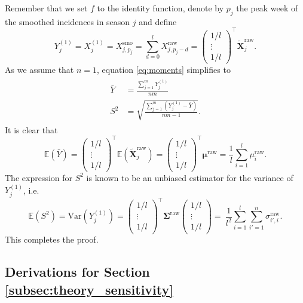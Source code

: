 \documentclass{article}
\begin{document}
Remember that we set $f$ to the identity function, denote by $p_j$ the peak week of the smoothed incidences in season $j$ and define
$$
Y_j^{(1)} = X_j^{(1)} = X^\text{smo}_{j, p_j} = \sum_{d = 0}^l X^\text{raw}_{j, p_j - d} = \begin{pmatrix} 1/l \\ \vdots \\ 1/l \end{pmatrix}^\top \tilde{\mathbf{X}}^{\text{raw}}_j.
$$
As we assume that $n = 1$, equation \eqref{eq:moments} simplifies to
\begin{align}
\begin{split}
\bar{Y} & = \frac{\sum_{j = 1}^m Y_j^{(1)}}{nm}\\
S^2 & = \sqrt{ \frac{\sum_{j = 1}^m (Y_j^{(1)}  - \bar{Y})}{nm - 1}}.
\end{split}
\end{align}
It is clear that
$$
\mathbb{E}(\bar{Y}) = \begin{pmatrix} 1/l \\ \vdots \\ 1/l \end{pmatrix}^\top \mathbb{E}(\tilde{\mathbf{X}}^{\text{raw}}_j) = \begin{pmatrix} 1/l \\ \vdots \\ 1/l \end{pmatrix}^\top \boldsymbol{\mu}^\text{raw} = \frac{1}{l}\sum_{i = 1}^l \mu^\text{raw}_i.
$$
The expression for $S^2$ is known to be an unbiased estimator for the variance of $Y_j^{(1)}$, i.e.
$$
\mathbb{E}(S^2) = \text{Var}(Y_j^{(1)}) = \begin{pmatrix} 1/l \\ \vdots \\ 1/l \end{pmatrix}^\top \mathbf{\Sigma}^\text{raw} \begin{pmatrix} 1/l \\ \vdots \\ 1/l \end{pmatrix} = \ \frac{1}{l^2} \sum_{i = 1}^l \sum_{i' = 1}^n \sigma^\text{raw}_{i', i}.
$$
This completes the proof.

\subsection{Derivations for Section \ref{subsec:theory_sensitivity}}
\end{document}
